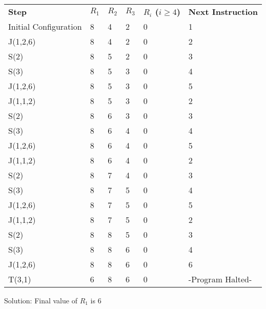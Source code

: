 \documentclass[12pt]{article}
\begin{document}
\begin{table}[h]
    \begin{tabular}{llllll}
    \textbf{Step}                  & \textbf{$R_1$} & \textbf{$R_2$} & \textbf{$R_3$} & \textbf{$R_i$ ($i\geq4$)} & \textbf{Next Instruction} \\
    Initial Configuration & 8   & 4   & 2   & 0          & 1                \\
    J(1,2,6)              & 8   & 4   & 2   & 0          & 2                \\
    S(2)                  & 8   & 5   & 2   & 0          & 3                \\
    S(3)                  & 8   & 5   & 3   & 0          & 4                \\
    J(1,2,6)              & 8   & 5   & 3   & 0          & 5                \\
    J(1,1,2)              & 8   & 5   & 3   & 0          & 2                \\
    S(2)                  & 8   & 6   & 3   & 0          & 3                \\
    S(3)                  & 8   & 6   & 4   & 0          & 4                \\
    J(1,2,6)              & 8   & 6   & 4   & 0          & 5                \\
    J(1,1,2)              & 8   & 6   & 4   & 0          & 2                \\
    S(2)                  & 8   & 7   & 4   & 0          & 3                \\
    S(3)                  & 8   & 7   & 5   & 0          & 4                \\
    J(1,2,6)              & 8   & 7   & 5   & 0          & 5                \\
    J(1,1,2)              & 8   & 7   & 5   & 0          & 2                \\
    S(2)                  & 8   & 8   & 5   & 0          & 3                \\
    S(3)                  & 8   & 8   & 6   & 0          & 4                \\
    J(1,2,6)              & 8   & 8   & 6   & 0          & 6                \\
    T(3,1)                & 6   & 8   & 6   & 0          & -Program Halted-               \\
    \end{tabular}
\end{table}

Solution: Final value of $R_1$ is $6$
\end{document}

